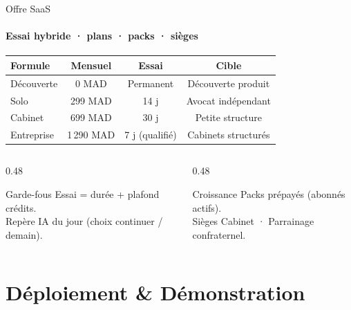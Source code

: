 \documentclass[aspectratio=169, t]{beamer}
\begin{document}
\begin{frame}{Offre SaaS}
\framesubtitle{Essai hybride · plans · packs · sièges}

\begin{table}
\small
\begin{tabular}{@{}lccc@{}}
\toprule
\textbf{Formule} & \textbf{Mensuel} & \textbf{Essai} & \textbf{Cible} \\
\midrule
Découverte & 0 MAD & Permanent & Découverte produit \\
Solo & 299 MAD & 14 j & Avocat indépendant \\
Cabinet & 699 MAD & 30 j & Petite structure \\
Entreprise & 1\,290 MAD & 7 j (qualifié) & Cabinets structurés \\
\bottomrule
\end{tabular}
\end{table}

\begin{columns}[T,onlytextwidth]
\begin{column}{0.48\textwidth}
  \begin{block}{Garde-fous}
    Essai = durée + plafond crédits.\\
    Repère IA du jour (choix continuer / demain).
  \end{block}
\end{column}
\begin{column}{0.48\textwidth}
  \begin{exampleblock}{Croissance}
    Packs prépayés (abonnés actifs).\\
    Sièges Cabinet · Parrainage confraternel.
  \end{exampleblock}
\end{column}
\end{columns}
\end{frame}

\section{Déploiement \& Démonstration}
\end{document}
